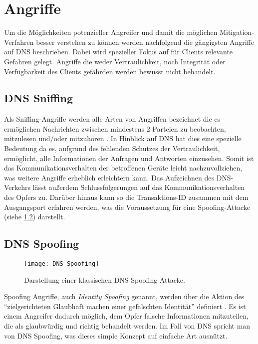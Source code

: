 \chapter{Angriffe}
\label{chap:attacks}
Um die Möglichkeiten potenzieller Angreifer und damit die möglichen Mitigation-Verfahren besser verstehen zu können werden nachfolgend die gängigsten Angriffe auf DNS beschrieben. Dabei wird spezieller Fokus auf für Clients relevante Gefahren gelegt. Angriffe die weder Vertraulichkeit, noch Integrität oder Verfügbarkeit des Clients gefährden werden bewusst nicht behandelt.

\section{DNS Sniffing}
\label{sec:attacks-dnssniffing}
Als Sniffing-Angriffe werden alle Arten von Angriffen bezeichnet die es ermöglichen Nachrichten zwischen mindestens 2 Parteien zu beobachten, mitzulesen und/oder mitzuhören \cite{CAPEC157}. In Hinblick auf DNS hat dies eine spezielle Bedeutung da es, aufgrund des fehlenden Schutzes der Vertraulichkeit, ermöglicht, alle Informationen der Anfragen und Antworten einzusehen. Somit ist das Kommunikationsverhalten der betroffenen Geräte leicht nachzuvollziehen, was weitere Angriffe erheblich erleichtern kann. Das Aufzeichnen des DNS-Verkehrs lässt außerdem Schlussfolgerungen auf das Kommunikationsverhalten des Opfers zu. Darüber hinaus kann so die Transaktions-ID zusammen mit dem Ausgangsport erfahren werden, was die Voraussetzung für eine Spoofing-Attacke (siehe \ref{sec:attacks-dnsspoofing}) darstellt. 

\section{DNS Spoofing}
\label{sec:attacks-dnsspoofing}
\begin{wrapfigure}{r}{0.5\textwidth}
    \begin{center}
        \texttt{[image: DNS\_Spoofing]}
    \end{center}
    \caption{Darstellung einer klassischen DNS Spoofing Attacke.}
    \label{img:dnsspoofing}
\end{wrapfigure}

Spoofing Angriffe, auch \textit{Identity Spoofing} genannt, werden über die Aktion des ``zielgerichteten Glaubhaft machen einer gefälschten Identität'' definiert \cite{CAPEC151}. Es ist einem Angreifer dadurch möglich, dem Opfer falsche Informationen mitzuteilen, die als glaubwürdig und richtig behandelt werden. Im Fall von DNS spricht man von DNS Spoofing, was dieses simple Konzept auf einfache Art ausnützt.

